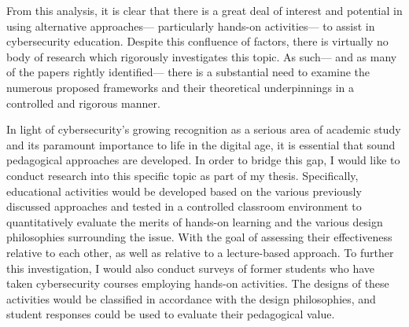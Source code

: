 
    From this analysis, it is clear that there is a great deal of interest and potential in using alternative approaches---%
particularly hands-on activities---%
to assist in cybersecurity education. %
Despite this confluence of factors, there is virtually no body of research which rigorously investigates this topic. %
As such---%
and as many of the papers rightly identified---%
there is a substantial need to examine the numerous proposed frameworks and their theoretical underpinnings in a controlled and rigorous manner. 

    In light of cybersecurity's growing recognition as a serious area of academic study and its paramount importance to life in the digital age, it is essential that sound pedagogical approaches are developed. %
In order to bridge this gap, I would like to conduct research into this specific topic as part of my thesis. %
Specifically, educational activities would be developed based on the various previously discussed approaches and tested in a controlled classroom environment to quantitatively evaluate the merits of hands-on learning and the various design philosophies surrounding the issue. %
With the goal of assessing their effectiveness relative to each other, as well as relative to a lecture-based approach. %
To further this investigation, I would also conduct surveys of former students who have taken cybersecurity courses employing hands-on activities. %
The designs of these activities would be classified in accordance with the design philosophies, and student responses could be used to evaluate their pedagogical value. %
 
